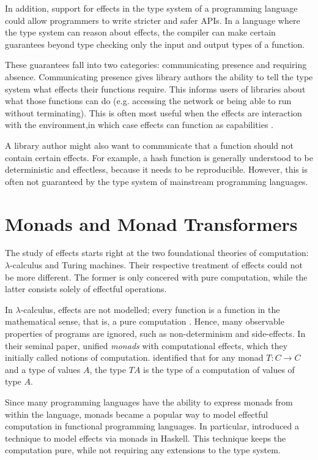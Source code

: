 In addition, support for effects in the type system of a programming language could allow programmers to write stricter and safer APIs. In a language where the type system can reason about effects, the compiler can make certain guarantees beyond type checking only the input and output types of a function.

These guarantees fall into two categories: communicating presence and requiring absence. Communicating presence gives library authors the ability to tell the type system what effects their functions require. This informs users of libraries about what those functions can do (e.g. accessing the network or being able to run without terminating). This is often most useful when the effects are interaction with the environment,in which case effects can function as capabilities \autocite{brachthauser_effects_2020}.

A library author might also want to communicate that a function should not contain certain effects. For example, a hash function is generally understood to be deterministic and effectless, because it needs to be reproducible. However, this is often not guaranteed by the type system of mainstream programming languages.\citationneeded{}

\section{Monads and Monad Transformers}

The study of effects starts right at the two foundational theories of computation: $\lambda$-calculus and Turing machines. Their respective treatment of effects could not be more different. The former is only concered with pure computation, while the latter consists solely of effectful operations.

In $\lambda$-calculus, effects are not modelled; every function is a function in the mathematical sense, that is, a pure computation \autocite{moggi_computational_1989}. Hence, many observable properties of programs are ignored, such as non-determinism and side-effects. In their seminal paper, \textcite{moggi_computational_1989} unified \emph{monads} with computational effects, which they initially called notions of computation. \citeauthor{moggi_computational_1989} identified that for any monad $T: C \to C$ and a type of values $A$, the type $T A$ is the type of a computation of values of type $A$.

Since many programming languages have the ability to express monads from within the language, monads became a popular way to model effectful computation in functional programming languages. In particular, \textcite{peyton_jones_imperative_1993} introduced a technique to model effects via monads in Haskell. This technique keeps the computation pure, while not requiring any extensions to the type system.

